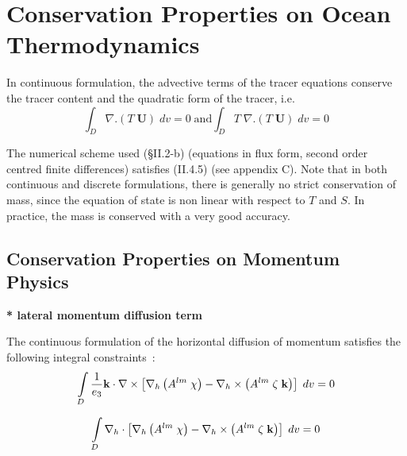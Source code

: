 \documentclass[NEMO_book]{subfiles}
\begin{document}
\section{Conservation Properties on Ocean Thermodynamics}
\label{Invariant_tra}

In continuous formulation, the advective terms of the tracer equations 
conserve the tracer content and the quadratic form of the tracer, i.e.
\begin{equation} \label{Eq_tra_tra2}
\int_D {\nabla .\left( {T\;{\textbf{U}}} \right)\;dv} =0
\;\text{and}
\int_D {T\;\nabla .\left( {T\;{\textbf{U}}} \right)\;dv} =0
\end{equation}

The numerical scheme used ({\S}II.2-b) (equations in flux form, second order 
centred finite differences) satisfies (II.4.5) (see appendix C). Note that 
in both continuous and discrete formulations, there is generally no strict 
conservation of mass, since the equation of state is non linear with respect 
to $T$ and $S$. In practice, the mass is conserved with a very good accuracy. 

\subsection{Conservation Properties on Momentum Physics}
\label{Invariant_dyn_physics}

\textbf{* lateral momentum diffusion term}

The continuous formulation of the horizontal diffusion of momentum satisfies 
the following integral constraints~:
\begin{equation} \label{Eq_dynldf_dyn}
\int\limits_D {\frac{1}{e_3 }{\rm {\bf k}}\cdot \nabla \times \left[ {\nabla 
_h \left( {A^{lm}\;\chi } \right)-\nabla _h \times \left( {A^{lm}\;\zeta 
\;{\rm {\bf k}}} \right)} \right]\;dv} =0
\end{equation}

\begin{equation} \label{Eq_dynldf_div}
\int\limits_D {\nabla _h \cdot \left[ {\nabla _h \left( {A^{lm}\;\chi } 
\right)-\nabla _h \times \left( {A^{lm}\;\zeta \;{\rm {\bf k}}} \right)} 
\right]\;dv} =0
\end{equation}
\end{document}
